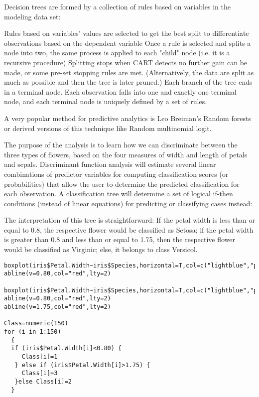 \documentclass[caret-main.tex]{subfiles}
\begin{document}
Decision trees are formed by a collection of rules based on variables in the modeling data set:

Rules based on variables' values are selected to get the best split to differentiate observations based on the dependent variable
Once a rule is selected and splits a node into two, the same process is applied to each "child" node (i.e. it is a recursive procedure)
Splitting stops when CART detects no further gain can be made, or some pre-set stopping rules are met. (Alternatively, the data are split as much as possible and then the tree is later pruned.)
Each branch of the tree ends in a terminal node. Each observation falls into one and exactly one terminal node, and each terminal node is uniquely defined by a set of rules.

A very popular method for predictive analytics is Leo Breiman's Random forests or derived versions of this technique like Random multinomial logit.


The purpose of the analysis is to learn how we can discriminate between the three types of flowers, based on the four measures of width and length of petals and sepals. Discriminant function analysis will estimate several linear combinations of predictor variables for computing classification scores (or probabilities) that allow the user to determine the predicted classification for each observation. A classification tree will determine a set of logical if-then conditions (instead of linear equations) for predicting or classifying cases instead:



The interpretation of this tree is straightforward: If the petal width is less than or equal to 0.8, the respective flower would be classified as Setosa; if the petal width is greater than 0.8 and less than or equal to 1.75, then the respective flower would be classified as Virginic; else, it belongs to class Versicol.


\begin{verbatim}
boxplot(iris$Petal.Width~iris$Species,horizontal=T,col=c("lightblue","pink","yellow"),font.lab=2,pch=16)
abline(v=0.80,col="red",lty=2)

boxplot(iris$Petal.Width~iris$Species,horizontal=T,col=c("lightblue","pink","yellow"),font.lab=2,pch=16)
abline(v=0.80,col="red",lty=2)
abline(v=1.75,col="red",lty=2)

Class=numeric(150)
for (i in 1:150)
  { 
  if (iris$Petal.Width[i]<0.80) { 
     Class[i]=1
   } else if (iris$Petal.Width[i]>1.75) { 
     Class[i]=3
   }else Class[i]=2
  }
\end{verbatim}
\end{document}
